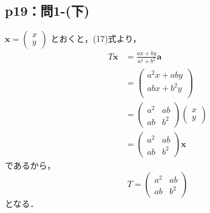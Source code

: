 \documentclass[uplatex,dvipdfmx,a4paper,11pt,fleqn]{jsarticle}
\begin{document}
    \subsection*{p19：問1-(下)}

\begin{tleftbar}
$\bm{x} =
\begin{pmatrix}
x \\
y
\end{pmatrix}
$
とおくと，(17)式より，
\begin{align*}
T \bm{x} &= \frac{ax+by}{a^2+b^2} \bm{a} \\
&=
\begin{pmatrix}
a^2x +aby \\
ab x + b^2y \\
\end{pmatrix}
\\
&=
\begin{pmatrix}
a^2 & ab \\
ab & b^2
\end{pmatrix}
\begin{pmatrix}
x \\
y
\end{pmatrix}
 \\
&= 
\begin{pmatrix}
a^2 & ab \\
ab & b^2
\end{pmatrix}
\bm{x}
\end{align*}
であるから，
\[
T=\begin{pmatrix}
a^2 & ab \\
ab & b^2
\end{pmatrix}
\]
となる．
\end{tleftbar}
%
\newpage
\end{document}
